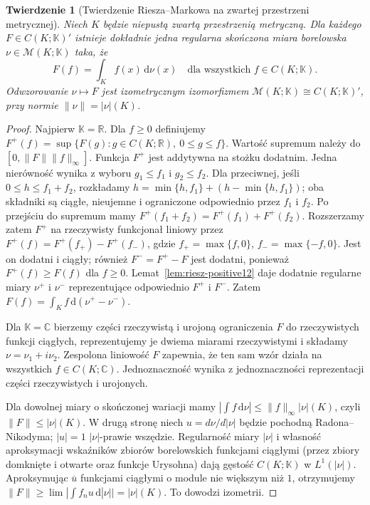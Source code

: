 \documentclass[11pt,a4paper]{article}
\numberwithin{equation}{section}
\theoremstyle{plain}
\newtheorem{twierdzenie}{Twierdzenie}[section]
\theoremstyle{definition}
\theoremstyle{remark}
\newcommand{\R}{\mathbb R}
\newcommand{\C}{\mathbb C}
\newcommand{\K}{\mathbb K}
\begin{document}
\begin{twierdzenie}[Twierdzenie Riesza--Markowa na zwartej przestrzeni metrycznej]
\label{thm:riesz-markov12}
Niech $K$ będzie niepustą zwartą przestrzenią metryczną.
Dla każdego $F\in C(K;\K)'$ istnieje dokładnie jedna
regularna skończona miara borelowska $\nu\in\mathcal M(K;\K)$
taka, że
\[
 F(f)=\int_K f(x)\,\mathrm d\nu(x)
 \quad\text{dla wszystkich }f\in C(K;\K).
\]
Odwzorowanie $\nu\mapsto F$ jest izometrycznym izomorfizmem
$\mathcal M(K;\K)\cong C(K;\K)'$, przy normie
$\|\nu\|=|\nu|(K)$.
\end{twierdzenie}
\begin{proof}
Najpierw $\K=\R$. Dla $f\ge0$ definiujemy
$F^+(f)=\sup\{F(g):g\in C(K;\R),\ 0\le g\le f\}$.
Wartość supremum należy do $[0,\|F\|\|f\|_\infty]$.
Funkcja $F^+$ jest addytywna na stożku dodatnim.
Jedna nierówność wynika z wyboru $g_1\le f_1$ i
$g_2\le f_2$. Dla przeciwnej, jeśli
$0\le h\le f_1+f_2$, rozkładamy
$h=\min\{h,f_1\}+(h-\min\{h,f_1\})$;
oba składniki są ciągłe, nieujemne i ograniczone odpowiednio
przez $f_1$ i $f_2$. Po przejściu do supremum mamy
$F^+(f_1+f_2)=F^+(f_1)+F^+(f_2)$.
Rozszerzamy zatem $F^+$ na rzeczywisty funkcjonał liniowy
przez $F^+(f)=F^+(f_+)-F^+(f_-)$, gdzie
$f_+=\max\{f,0\}$, $f_-=\max\{-f,0\}$.
Jest on dodatni i ciągły; również $F^-=F^+-F$ jest dodatni,
ponieważ $F^+(f)\ge F(f)$ dla $f\ge0$.
Lemat~\ref{lem:riesz-positive12} daje dodatnie regularne miary
$\nu^+$ i $\nu^-$ reprezentujące odpowiednio $F^+$ i $F^-$.
Zatem $F(f)=\int_Kf\,\mathrm d(\nu^+-\nu^-)$.

Dla $\K=\C$ bierzemy części rzeczywistą i urojoną
ograniczenia $F$ do rzeczywistych funkcji ciągłych,
reprezentujemy je dwiema miarami rzeczywistymi i składamy
$\nu=\nu_1+i\nu_2$. Zespolona liniowość $F$ zapewnia,
że ten sam wzór działa na wszystkich $f\in C(K;\C)$.
Jednoznaczność wynika z jednoznaczności reprezentacji
części rzeczywistych i urojonych.

Dla dowolnej miary o skończonej wariacji mamy
$|\int f\,\mathrm d\nu|\le\|f\|_\infty|\nu|(K)$,
czyli $\|F\|\le|\nu|(K)$. W drugą stronę niech
$u=d\nu/d|\nu|$ będzie pochodną Radona--Nikodyma;
$|u|=1$ $|\nu|$-prawie wszędzie. Regularność miary
$|\nu|$ i własność aproksymacji wskaźników zbiorów
borelowskich funkcjami ciągłymi (przez zbiory domknięte
i otwarte oraz funkcje Urysohna) dają gęstość $C(K;\K)$
w $L^1(|\nu|)$. Aproksymując $\overline u$ funkcjami
ciągłymi o module nie większym niż $1$, otrzymujemy
$\|F\|\ge\lim|\int f_nu\,\mathrm d|\nu||=|\nu|(K)$.
To dowodzi izometrii.
\end{proof}
\end{document}

